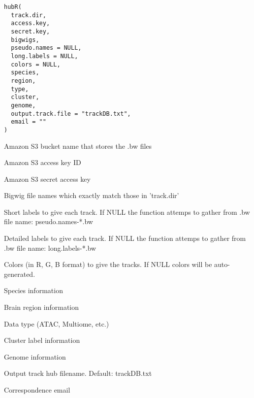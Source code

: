 \documentclass[a4paper]{book}
\begin{document}
%
\begin{Usage}
\begin{verbatim}
hubR(
  track.dir,
  access.key,
  secret.key,
  bigwigs,
  pseudo.names = NULL,
  long.labels = NULL,
  colors = NULL,
  species,
  region,
  type,
  cluster,
  genome,
  output.track.file = "trackDB.txt",
  email = ""
)
\end{verbatim}
\end{Usage}
%
\begin{Arguments}
\begin{ldescription}
\item[\code{track.dir}] Amazon S3 bucket name that stores the .bw files

\item[\code{access.key}] Amazon S3 access key ID

\item[\code{secret.key}] Amazon S3 secret access key

\item[\code{bigwigs}] Bigwig file names which exactly match those in 'track.dir'

\item[\code{pseudo.names}] Short labels to give each track. If NULL the function attemps to gather from .bw file name: pseudo.names-*.bw

\item[\code{long.labels}] Detailed labels to give each track. If NULL the function attemps to gather from .bw file name: long.labels-*.bw

\item[\code{colors}] Colors (in R, G, B format) to give the tracks. If NULL colors will be auto-generated.

\item[\code{species}] Species information

\item[\code{region}] Brain region information

\item[\code{type}] Data type (ATAC, Multiome, etc.)

\item[\code{cluster}] Cluster label information

\item[\code{genome}] Genome information

\item[\code{output.track.file}] Output track hub filename. Default: trackDB.txt

\item[\code{email}] Correspondence email
\end{ldescription}
\end{Arguments}
\printindex{}
\end{document}
